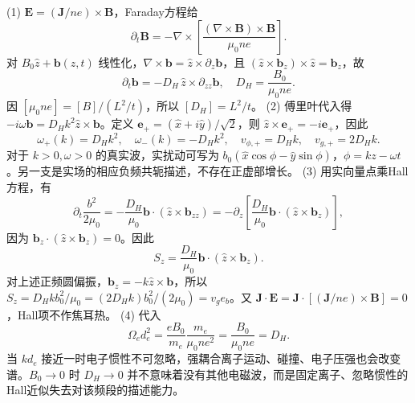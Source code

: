 (1) \(\boldsymbol E=(\boldsymbol J/ne)\times\boldsymbol B\)，Faraday方程给
\[
\partial_t\boldsymbol B=-\nabla\times\left[\frac{(\nabla\times\boldsymbol B)\times\boldsymbol B}{\mu_0ne}\right].
\]
对 \(B_0\hat z+\boldsymbol b(z,t)\) 线性化，\(\nabla\times\boldsymbol b=\hat z\times\partial_z\boldsymbol b\)，且 \((\hat z\times\boldsymbol b_z)\times\hat z=\boldsymbol b_z\)，故
\[
\partial_t\boldsymbol b=-D_H\,\hat z\times\partial_{zz}\boldsymbol b,\quad
D_H=\frac{B_0}{\mu_0ne}.
\]
因 \([\mu_0ne]=[B]/(L^2/t)\)，所以 \([D_H]=L^2/t\)。
(2) 傅里叶代入得 \(-i\omega\boldsymbol b=D_Hk^2\hat z\times\boldsymbol b\)。定义 \(\boldsymbol e_+=(\hat x+i\hat y)/\sqrt2\)，则 \(\hat z\times\boldsymbol e_+=-i\boldsymbol e_+\)，因此
\[
\omega_+(k)=D_Hk^2,\quad \omega_-(k)=-D_Hk^2,\quad
v_{\phi,+}=D_Hk,\quad v_{g,+}=2D_Hk.
\]
对于 \(k>0,\omega>0\) 的真实波，实扰动可写为 \(b_0(\hat x\cos\phi-\hat y\sin\phi)\)，\(\phi=kz-\omega t\)。另一支是实场的相应负频共轭描述，不存在正虚部增长。
(3) 用实向量点乘Hall方程，有
\[
\partial_t\frac{b^2}{2\mu_0}
=-\frac{D_H}{\mu_0}\boldsymbol b\cdot(\hat z\times\boldsymbol b_{zz})
=-\partial_z\left[\frac{D_H}{\mu_0}\boldsymbol b\cdot(\hat z\times\boldsymbol b_z)\right],
\]
因为 \(\boldsymbol b_z\cdot(\hat z\times\boldsymbol b_z)=0\)。因此
\[
S_z=\frac{D_H}{\mu_0}\boldsymbol b\cdot(\hat z\times\boldsymbol b_z).
\]
对上述正频圆偏振，\(\boldsymbol b_z=-k\hat z\times\boldsymbol b\)，所以 \(S_z=D_Hkb_0^2/\mu_0=(2D_Hk)b_0^2/(2\mu_0)=v_ge_b\)。又 \(\boldsymbol J\cdot\boldsymbol E=\boldsymbol J\cdot[(\boldsymbol J/ne)\times\boldsymbol B]=0\)，Hall项不作焦耳热。
(4) 代入
\[
\Omega_ed_e^2=\frac{eB_0}{m_e}\frac{m_e}{\mu_0ne^2}
=\frac{B_0}{\mu_0ne}=D_H.
\]
当 \(k d_e\) 接近一时电子惯性不可忽略，强耦合离子运动、碰撞、电子压强也会改变谱。\(B_0\to0\) 时 \(D_H\to0\) 并不意味着没有其他电磁波，而是固定离子、忽略惯性的Hall近似失去对该频段的描述能力。
